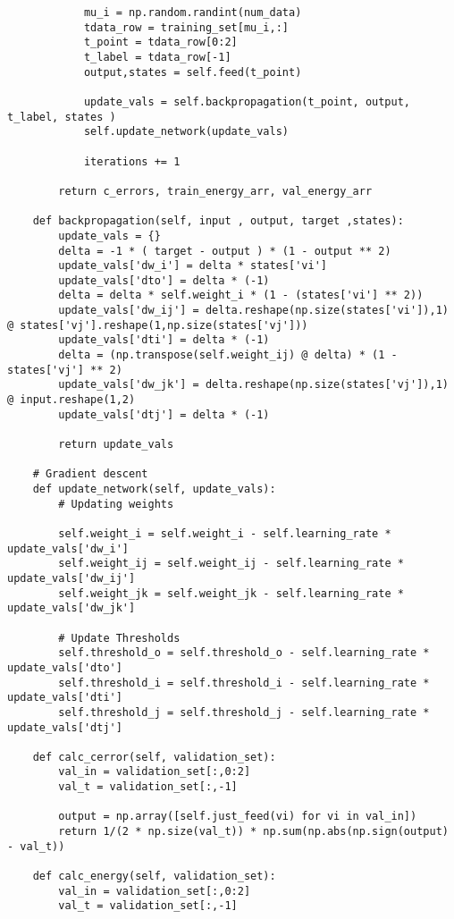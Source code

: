 \begin{verbatim}
            mu_i = np.random.randint(num_data)
            tdata_row = training_set[mu_i,:]
            t_point = tdata_row[0:2]
            t_label = tdata_row[-1]
            output,states = self.feed(t_point)

            update_vals = self.backpropagation(t_point, output, t_label, states )
            self.update_network(update_vals)

            iterations += 1
            
        return c_errors, train_energy_arr, val_energy_arr

    def backpropagation(self, input , output, target ,states):
        update_vals = {}
        delta = -1 * ( target - output ) * (1 - output ** 2)
        update_vals['dw_i'] = delta * states['vi']
        update_vals['dto'] = delta * (-1)
        delta = delta * self.weight_i * (1 - (states['vi'] ** 2))
        update_vals['dw_ij'] = delta.reshape(np.size(states['vi']),1) @ states['vj'].reshape(1,np.size(states['vj']))
        update_vals['dti'] = delta * (-1)
        delta = (np.transpose(self.weight_ij) @ delta) * (1 - states['vj'] ** 2)
        update_vals['dw_jk'] = delta.reshape(np.size(states['vj']),1) @ input.reshape(1,2)
        update_vals['dtj'] = delta * (-1)

        return update_vals

    # Gradient descent
    def update_network(self, update_vals):
        # Updating weights

        self.weight_i = self.weight_i - self.learning_rate * update_vals['dw_i']
        self.weight_ij = self.weight_ij - self.learning_rate * update_vals['dw_ij']
        self.weight_jk = self.weight_jk - self.learning_rate * update_vals['dw_jk']

        # Update Thresholds
        self.threshold_o = self.threshold_o - self.learning_rate * update_vals['dto']
        self.threshold_i = self.threshold_i - self.learning_rate * update_vals['dti']
        self.threshold_j = self.threshold_j - self.learning_rate * update_vals['dtj']
    
    def calc_cerror(self, validation_set):
        val_in = validation_set[:,0:2]
        val_t = validation_set[:,-1]

        output = np.array([self.just_feed(vi) for vi in val_in])
        return 1/(2 * np.size(val_t)) * np.sum(np.abs(np.sign(output) - val_t))

    def calc_energy(self, validation_set):
        val_in = validation_set[:,0:2]
        val_t = validation_set[:,-1]


\end{verbatim}
